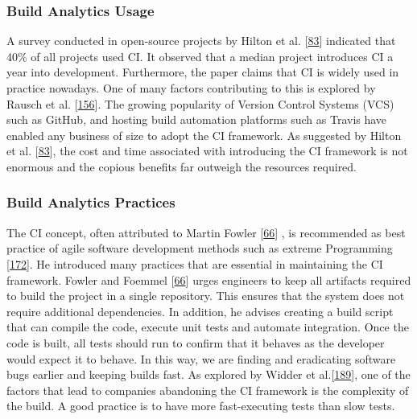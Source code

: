 \documentclass[]{book}
\begin{document}
\subsubsection{Build Analytics Usage}\label{build-analytics-usage}

A survey conducted in open-source projects by Hilton et al.
{[}\protect\hyperlink{ref-hilton2016usage}{83}{]} indicated that 40\% of
all projects used CI. It observed that a median project introduces CI a
year into development. Furthermore, the paper claims that CI is widely
used in practice nowadays. One of many factors contributing to this is
explored by Rausch et al.
{[}\protect\hyperlink{ref-rausch2017empirical}{156}{]}. The growing
popularity of Version Control Systems (VCS) such as GitHub, and hosting
build automation platforms such as Travis have enabled any business of
size to adopt the CI framework. As suggested by Hilton et al.
{[}\protect\hyperlink{ref-hilton2016usage}{83}{]}, the cost and time
associated with introducing the CI framework is not enormous and the
copious benefits far outweigh the resources required.

\subsubsection{Build Analytics
Practices}\label{build-analytics-practices}

The CI concept, often attributed to Martin Fowler
{[}\protect\hyperlink{ref-fowler2006continuous}{66}{]} , is recommended
as best practice of agile software development methods such as extreme
Programming {[}\protect\hyperlink{ref-stolberg2009enabling}{172}{]}. He
introduced many practices that are essential in maintaining the CI
framework. Fowler and Foemmel
{[}\protect\hyperlink{ref-fowler2006continuous}{66}{]} urges engineers
to keep all artifacts required to build the project in a single
repository. This ensures that the system does not require additional
dependencies. In addition, he advises creating a build script that can
compile the code, execute unit tests and automate integration. Once the
code is built, all tests should run to confirm that it behaves as the
developer would expect it to behave. In this way, we are finding and
eradicating software bugs earlier and keeping builds fast. As explored
by Widder et al.{[}\protect\hyperlink{ref-widder2018m}{189}{]}, one of
the factors that lead to companies abandoning the CI framework is the
complexity of the build. A good practice is to have more fast-executing
tests than slow tests.
\end{document}
